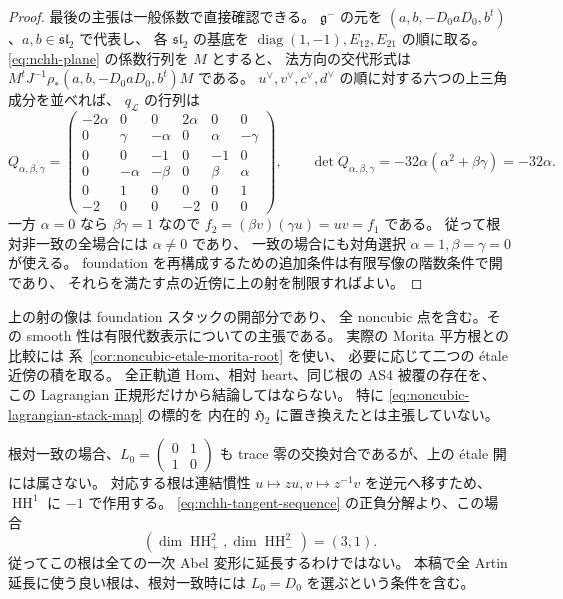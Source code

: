 \begin{proof}
最後の主張は一般係数で直接確認できる。
$\mathfrak g^-$ の元を
$(a,b,-D_0aD_0,b^t)$、$a,b\in\mathfrak{sl}_2$ で代表し、
各 $\mathfrak{sl}_2$ の基底を
$\operatorname{diag}(1,-1),E_{12},E_{21}$ の順に取る。
\eqref{eq:nchh-plane} の係数行列を $M$ とすると、
法方向の交代形式は $M^tJ^{-1}\rho_*(a,b,-D_0aD_0,b^t)M$ である。
$u^\vee,v^\vee,c^\vee,d^\vee$ の順に対する六つの上三角成分を並べれば、
$q_{\mathscr L}$ の行列は
\[
 Q_{\alpha,\beta,\gamma}=
 \begin{pmatrix}
 -2\alpha&0&0&2\alpha&0&0\\
 0&\gamma&-\alpha&0&\alpha&-\gamma\\
 0&0&-1&0&-1&0\\
 0&-\alpha&-\beta&0&\beta&\alpha\\
 0&1&0&0&0&1\\
 -2&0&0&-2&0&0
 \end{pmatrix},
 \qquad
 \det Q_{\alpha,\beta,\gamma}
       =-32\alpha(\alpha^2+\beta\gamma)=-32\alpha.
\]
一方 $\alpha=0$ なら $\beta\gamma=1$ なので
$f_2=(\beta v)(\gamma u)=uv=f_1$ である。
従って根対非一致の全場合には $\alpha\ne0$ であり、
一致の場合にも対角選択 $\alpha=1,\beta=\gamma=0$ が使える。
foundation を再構成するための追加条件は有限写像の階数条件で開であり、
それらを満たす点の近傍に上の射を制限すればよい。
\end{proof}

\begin{remark}[この表示が与えるもの]
\label{rem:noncubic-lagrangian-scope}
上の射の像は foundation スタックの開部分であり、
全 noncubic 点を含む。その smooth 性は有限代数表示についての主張である。
実際の Morita 平方根との比較には
系~\ref{cor:noncubic-etale-morita-root} を使い、
必要に応じて二つの \texorpdfstring{\'etale}{etale} 近傍の積を取る。
全正軌道 Hom、相対 heart、同じ根の AS4 被覆の存在を、
この Lagrangian 正規形だけから結論してはならない。
特に \eqref{eq:noncubic-lagrangian-stack-map} の標的を
内在的 $\mathfrak H_2$ に置き換えたとは主張していない。
\end{remark}

\begin{remark}
\label{rem:noncubic-offdiagonal-root}
根対一致の場合、$L_0=\left(\begin{smallmatrix}0&1\\1&0\end{smallmatrix}\right)$
も trace 零の交換対合であるが、上の \texorpdfstring{\'etale}{etale} 開には属さない。
対応する根は連結慣性
$u\mapsto zu,v\mapsto z^{-1}v$ を逆元へ移すため、
$\operatorname{HH}^1$ に $-1$ で作用する。
\eqref{eq:nchh-tangent-sequence} の正負分解より、この場合
\[
 (\dim\operatorname{HH}^2_+,\dim\operatorname{HH}^2_-)=(3,1).
\]
従ってこの根は全ての一次 Abel 変形に延長するわけではない。
本稿で全 Artin 延長に使う良い根は、根対一致時には
$L_0=D_0$ を選ぶという条件を含む。
\end{remark}

